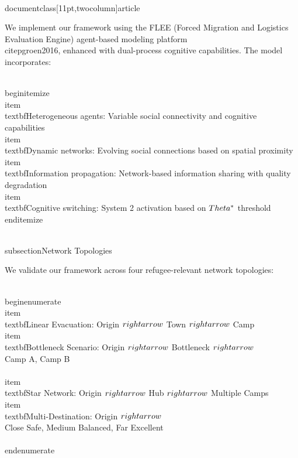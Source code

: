 \\documentclass[11pt,twocolumn]{article}
\begin{document}
We implement our framework using the FLEE (Forced Migration and Logistics Evaluation Engine) agent-based modeling platform \\citep{groen2016}, enhanced with dual-process cognitive capabilities. The model incorporates:

\\begin{itemize}
    \\item \\textbf{Heterogeneous agents}: Variable social connectivity and cognitive capabilities
    \\item \\textbf{Dynamic networks}: Evolving social connections based on spatial proximity
    \\item \\textbf{Information propagation}: Network-based information sharing with quality degradation
    \\item \\textbf{Cognitive switching}: System 2 activation based on $\\Theta^*$ threshold
\\end{itemize}

\\subsection{Network Topologies}

We validate our framework across four refugee-relevant network topologies:

\\begin{enumerate}
    \\item \\textbf{Linear Evacuation}: Origin $\\rightarrow$ Town $\\rightarrow$ Camp
    \\item \\textbf{Bottleneck Scenario}: Origin $\\rightarrow$ Bottleneck $\\rightarrow$ \\{Camp A, Camp B\\}
    \\item \\textbf{Star Network}: Origin $\\rightarrow$ Hub $\\rightarrow$ Multiple Camps
    \\item \\textbf{Multi-Destination}: Origin $\\rightarrow$ \\{Close Safe, Medium Balanced, Far Excellent\\}
\\end{enumerate}
\end{document}
